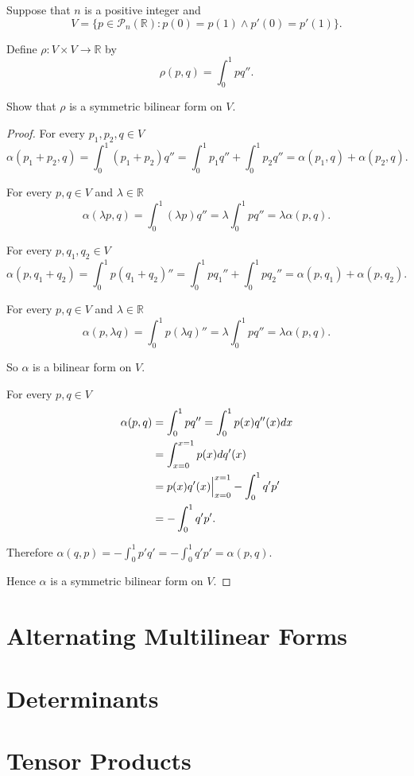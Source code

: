 \begin{exercise}\label{chapter9:sectionA:exercise10}
    Suppose that $n$ is a positive integer and
    \[
        V = \{ p\in\mathscr{P}_{n}(\mathbb{R}): p(0) = p(1) \land p'(0) = p'(1) \}.
    \]

    Define $\rho: V\times V\to\mathbb{R}$ by
    \[
        \rho(p, q) = \int^{1}_{0}pq''.
    \]

    Show that $\rho$ is a symmetric bilinear form on $V$.
\end{exercise}

\begin{proof}
    For every $p_{1}, p_{2}, q \in V$
    \[
        \alpha(p_{1} + p_{2}, q) = \int^{1}_{0}(p_{1} + p_{2})q'' = \int^{1}_{0}p_{1}q'' + \int^{1}_{0}p_{2}q'' = \alpha(p_{1}, q) + \alpha(p_{2}, q).
    \]

    For every $p, q\in V$ and $\lambda\in\mathbb{R}$
    \[
        \alpha(\lambda p, q) = \int^{1}_{0}(\lambda p)q'' = \lambda\int^{1}_{0}pq'' = \lambda\alpha(p, q).
    \]

    For every $p, q_{1}, q_{2}\in V$
    \[
        \alpha(p, q_{1} + q_{2}) = \int^{1}_{0}p(q_{1} + q_{2})'' = \int^{1}_{0}pq_{1}'' + \int^{1}_{0}pq_{2}'' = \alpha(p, q_{1}) + \alpha(p, q_{2}).
    \]

    For every $p, q\in V$ and $\lambda\in\mathbb{R}$
    \[
        \alpha(p, \lambda q) = \int^{1}_{0}p(\lambda q)'' = \lambda\int^{1}_{0}pq'' = \lambda\alpha(p, q).
    \]

    So $\alpha$ is a bilinear form on $V$.

    For every $p, q\in V$
    \begin{align*}
        \alpha(p, q) & = \int^{1}_{0}pq'' = \int^{1}_{0}p(x)q''(x)dx         \\
                     & = \int^{x=1}_{x=0}p(x)dq'(x)                          \\
                     & = p(x)q'(x)\Big{\vert}^{x=1}_{x=0} - \int^{1}_{0}q'p' \\
                     & = -\int^{1}_{0}q'p'.
    \end{align*}

    Therefore $\alpha(q, p) = -\int^{1}_{0}p'q' = -\int^{1}_{0}q'p' = \alpha(p, q)$.

    Hence $\alpha$ is a symmetric bilinear form on $V$.
\end{proof}
\newpage

\section{Alternating Multilinear Forms}

\section{Determinants}

\section{Tensor Products}

